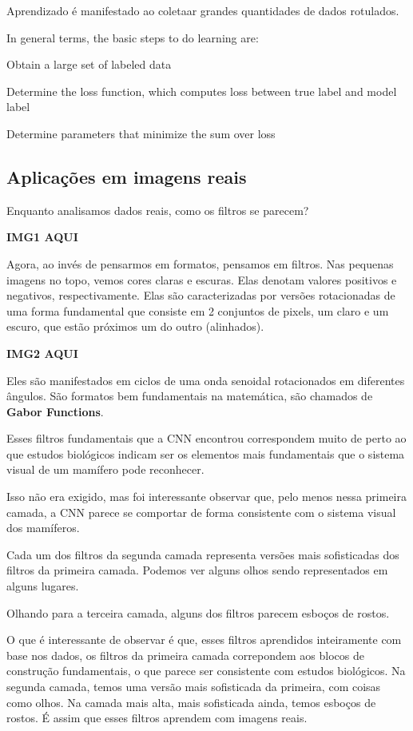 \documentclass[11pt, a4paper]{article}
\begin{document}
\begin{center}
Aprendizado é manifestado ao coletaar grandes quantidades de dados rotulados.

In general terms, the basic steps to do learning are:

Obtain a large set of labeled data

Determine the loss function, which computes loss between true label and model label

Determine parameters that minimize the sum over loss

\end{center}

\subsection{Aplicações em imagens reais}

Enquanto analisamos dados reais, como os filtros se parecem?

\textbf{IMG1 AQUI}

Agora, ao invés de pensarmos em formatos, pensamos em filtros. Nas pequenas imagens no topo, vemos cores claras e escuras. Elas denotam valores positivos e negativos, respectivamente. Elas são caracterizadas por versões rotacionadas de uma forma fundamental que consiste em 2 conjuntos de pixels, um claro e um escuro, que estão próximos um do outro (alinhados).

\textbf{IMG2 AQUI}

Eles são manifestados em ciclos de uma onda senoidal rotacionados em diferentes ângulos. São formatos bem fundamentais na matemática, são chamados de \textbf{Gabor Functions}.

Esses filtros fundamentais que a CNN encontrou correspondem muito de perto ao que estudos biológicos indicam ser os elementos mais fundamentais que o sistema visual de um mamífero pode reconhecer.

Isso não era exigido, mas foi interessante observar que, pelo menos nessa primeira camada, a CNN parece se comportar de forma consistente com o sistema visual dos mamíferos.

Cada um dos filtros da segunda camada representa versões mais sofisticadas  dos filtros da primeira camada. Podemos ver alguns olhos sendo representados em alguns lugares.

Olhando para a terceira camada, alguns dos filtros parecem esboços de rostos.

O que é interessante de observar é que, esses filtros aprendidos inteiramente com base nos dados, os filtros da primeira camada correpondem aos blocos de construção fundamentais, o que parece ser consistente com estudos biológicos. Na segunda camada, temos uma versão mais sofisticada da primeira, com coisas como olhos. Na camada mais alta, mais sofisticada ainda, temos esboços de rostos. É assim que esses filtros aprendem com imagens reais.
\end{document}
